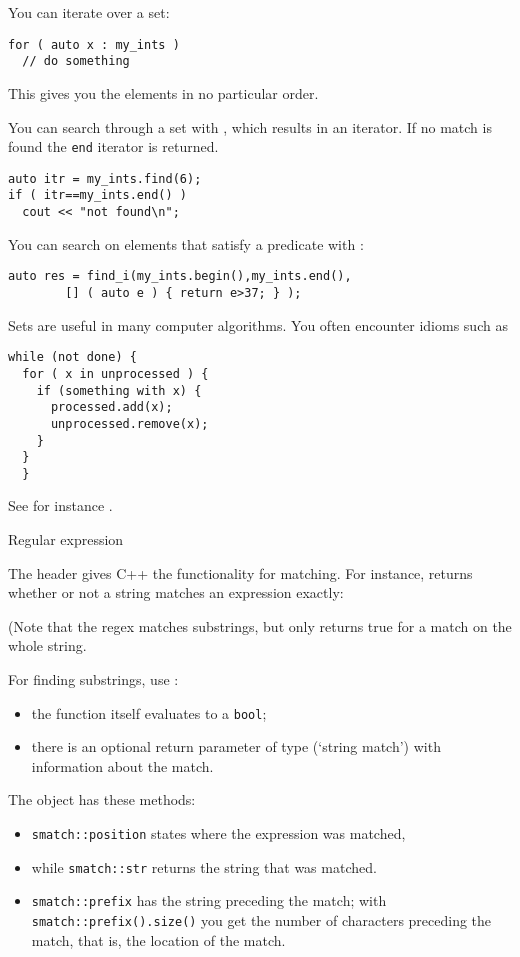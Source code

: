 You can iterate over a set:
\begin{lstlisting}
for ( auto x : my_ints )
  // do something  
\end{lstlisting}
This gives you the elements in no particular order.

You can search through a set with ,
which results in an iterator.
If no match is found the \lstinline{end} iterator
is returned.
\begin{lstlisting}
auto itr = my_ints.find(6);
if ( itr==my_ints.end() )
  cout << "not found\n";
\end{lstlisting}
You can search on elements that satisfy a predicate
with :
\begin{lstlisting}
auto res = find_i(my_ints.begin(),my_ints.end(),
        [] ( auto e ) { return e>37; } );
\end{lstlisting}

Sets are useful in many computer algorithms.
You often encounter idioms such as
\begin{lstlisting}
while (not done) {
  for ( x in unprocessed ) {
    if (something with x) {
      processed.add(x);
      unprocessed.remove(x);
    }
  }
  }
\end{lstlisting}
See for instance .

 {Regular expression}

The header  gives C++ the functionality for
 matching. For instance,
 returns whether or not
a string matches an expression exactly:


(Note that the regex matches substrings, but
 only returns true for
a match on the whole string.

For finding substrings, use :
\begin{itemize}
\item the function itself evaluates to a \lstinline{bool};
\item there is an optional return parameter of type 
  (`string match') with information about the match.
\end{itemize}
The  object has these methods:
\begin{itemize}
\item \lstinline{smatch::position} states where the expression
  was matched,
\item while \lstinline{smatch::str} returns the string that
  was matched.
\item \lstinline{smatch::prefix} has the string preceding the match;
  with \lstinline{smatch::prefix().size()} you get the number of characters
  preceding the match, that is, the location of the match.
\end{itemize}

